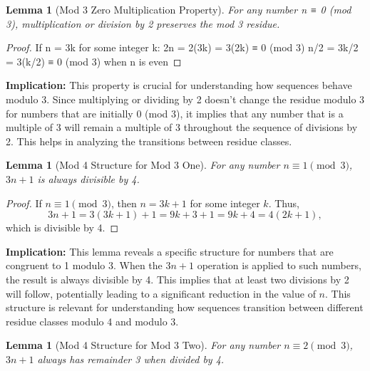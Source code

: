 \documentclass[11pt]{article}
\newtheorem{lemma}[theorem]{Lemma}
\begin{document}
\begin{lemma}[Mod 3 Zero Multiplication Property]
For any number n ≡ 0 (mod 3), multiplication or division by 2 preserves the mod 3 residue.
\end{lemma}

\begin{proof}
If n = 3k for some integer k:
2n = 2(3k) = 3(2k) ≡ 0 (mod 3)
n/2 = 3k/2 = 3(k/2) ≡ 0 (mod 3) when n is even
\end{proof}

\textbf{Implication:} This property is crucial for understanding how sequences behave modulo 3. Since multiplying or dividing by 2 doesn't change the residue modulo 3 for numbers that are initially 0 (mod 3), it implies that any number that is a multiple of 3 will remain a multiple of 3 throughout the sequence of divisions by 2. This helps in analyzing the transitions between residue classes.

\begin{lemma}[Mod 4 Structure for Mod 3 One]
For any number \(n \equiv 1 \pmod{3}\), \(3n+1\) is always divisible by 4.
\end{lemma}

\begin{proof}
If \(n \equiv 1 \pmod{3}\), then \(n = 3k + 1\) for some integer \(k\). Thus,
\[
3n + 1 = 3(3k + 1) + 1 = 9k + 3 + 1 = 9k + 4 = 4(2k + 1),
\]
which is divisible by 4.
\end{proof}

\textbf{Implication:} This lemma reveals a specific structure for numbers that are congruent to 1 modulo 3. When the \(3n+1\) operation is applied to such numbers, the result is always divisible by 4. This implies that at least two divisions by 2 will follow, potentially leading to a significant reduction in the value of \(n\). This structure is relevant for understanding how sequences transition between different residue classes modulo 4 and modulo 3.

\begin{lemma}[Mod 4 Structure for Mod 3 Two]
For any number \(n \equiv 2 \pmod{3}\), \(3n+1\) always has remainder 3 when divided by 4.
\end{lemma}
\end{document}
